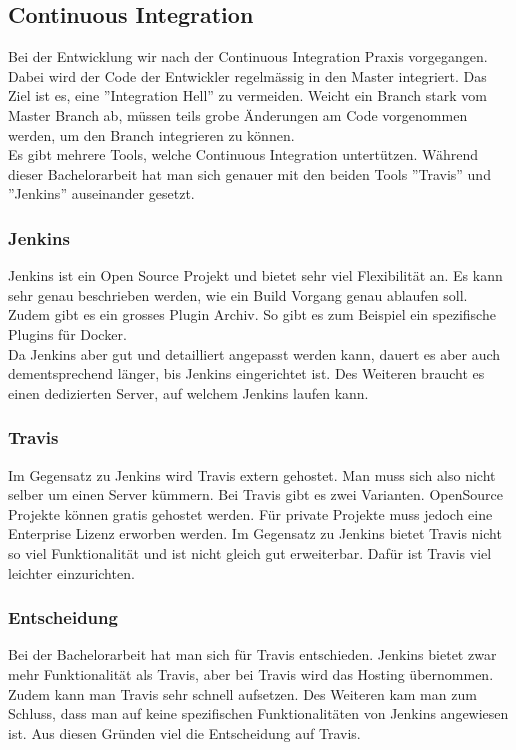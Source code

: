 \subsection{Continuous Integration}
Bei der Entwicklung wir nach der Continuous Integration Praxis vorgegangen. Dabei wird der Code der Entwickler regelmässig in den Master integriert. Das Ziel ist es, eine ''Integration Hell'' zu vermeiden. Weicht ein Branch stark vom Master Branch ab, müssen teils grobe Änderungen am Code vorgenommen werden, um den Branch integrieren zu können.
\\
Es gibt mehrere Tools, welche Continuous Integration untertützen. Während dieser Bachelorarbeit hat man sich genauer mit den beiden Tools ''Travis'' und ''Jenkins'' auseinander gesetzt.

\subsubsection{Jenkins}
Jenkins ist ein Open Source Projekt und bietet sehr viel Flexibilität an. Es kann sehr genau beschrieben werden, wie ein Build Vorgang genau ablaufen soll. Zudem gibt es ein grosses Plugin Archiv. So gibt es zum Beispiel ein spezifische Plugins für Docker.
\\
Da Jenkins aber gut und detailliert angepasst werden kann, dauert es aber auch dementsprechend länger, bis Jenkins eingerichtet ist. Des Weiteren braucht es einen dedizierten Server, auf welchem Jenkins laufen kann.

\subsubsection{Travis}
Im Gegensatz zu Jenkins wird Travis extern gehostet. Man muss sich also nicht selber um einen Server kümmern. Bei Travis gibt es zwei Varianten. OpenSource Projekte können gratis gehostet werden. Für private Projekte muss jedoch eine Enterprise Lizenz erworben werden. Im Gegensatz zu Jenkins bietet Travis nicht so viel Funktionalität und ist nicht gleich gut erweiterbar. Dafür ist Travis viel leichter einzurichten.

\subsubsection*{Entscheidung}
Bei der Bachelorarbeit hat man sich für Travis entschieden. Jenkins bietet zwar mehr Funktionalität als Travis, aber bei Travis wird das Hosting übernommen. Zudem kann man Travis sehr schnell aufsetzen.
Des Weiteren kam man zum Schluss, dass man auf keine spezifischen Funktionalitäten von Jenkins angewiesen ist. Aus diesen Gründen viel die Entscheidung auf Travis.

\newpage